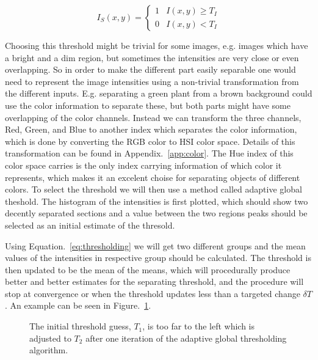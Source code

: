 \begin{equation}
    I_S(x,y)=\left \{ \begin{array}{ll}
    1 & I(x,y) \geq T_I \\
    0 & I(x,y) < T_I
    \end{array} \right.
    \label{eq:thresholding}
\end{equation}

Choosing this threshold might be trivial for some images, e.g. images which have a bright and a dim region, but sometimes the intensities are very close or even overlapping. So in order to make the different part easily separable one would need to represent the image intensities using a non-trivial transformation from the different inputs. E.g. separating a green plant from a brown background could use the color information to separate these, but both parts might have some overlapping of the color channels. Instead we can transform the three channels, Red, Green, and Blue to another index which separates the color information, which is done by converting the RGB color to HSI color space. Details of this transformation can be found in Appendix.~\ref{app:color}. The Hue index of this color space carries is the only index carrying information of which color it represents, which makes it an excelent choise for separating objects of different colors. To select the threshold we will then use a method called adaptive global theshold. The histogram of the intensities is first plotted, which should show two decently separated sections and a value between the two regions peaks should be selected as an initial estimate of the thresold.

Using Equation.~\eqref{eq:thresholding} we will get two different groups and the mean values of the intensities in respective group should be calculated. The threshold is then updated to be the mean of the means, which will procedurally produce better and better  estimates for the separating threshold, and the procedure will stop at convergence or when the threshold updates less than a targeted change $\delta T$. An example can be seen in Figure.~\ref{fig:adaptiveThreshold}.

\begin{figure}
    \centering
    
    \caption{\label{fig:adaptiveThreshold}The initial threshold guess, $T_1$, is too far to the left which is adjusted to $T_2$ after one iteration of the adaptive global thresholding algorithm.}
\end{figure}


